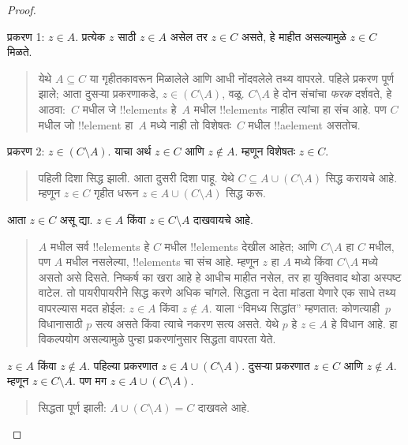 \documentclass[../../../include/open-logic-section]{subfiles}
\begin{document}
\begin{proof}
\begin{quote}
\end{quote}
प्रकरण 1: $z \in A$. प्रत्येक $z$ साठी $z \in A$ असेल तर $z \in C$ असते, हे माहीत असल्यामुळे $z \in C$ मिळते.
\begin{quote}
येथे $A \subseteq C$ या गृहीतकावरून मिळालेले आणि आधी नोंदवलेले तथ्य वापरले. पहिले प्रकरण पूर्ण झाले; आता दुसऱ्या प्रकरणाकडे, $z \in (C \setminus A)$, वळू. $C \setminus A$ हे दोन संचांचा \emph{फरक} दर्शवते, हे आठवा:~$C$ मधील जे !!{element}s हे~$A$ मधील !!{element}s नाहीत त्यांचा हा संच आहे. पण $C$ मधील जो !!{element} हा~$A$ मध्ये नाही तो विशेषतः~$C$ मधील !!a{element} असतोच.
\end{quote}
प्रकरण 2: $z \in (C \setminus A)$. याचा अर्थ $z \in C$ आणि $z \notin A$. म्हणून विशेषतः $z \in C$.
\begin{quote}
पहिली दिशा सिद्ध झाली. आता दुसरी दिशा पाहू. येथे $C \subseteq A \cup (C \setminus A)$ सिद्ध करायचे आहे. म्हणून $z \in C$ गृहीत धरून $z \in A \cup (C \setminus A)$ सिद्ध करू.
\end{quote}
आता $z \in C$ असू द्या. $z \in A$ किंवा $z \in C \setminus A$ दाखवायचे आहे.
\begin{quote}
$A$ मधील सर्व !!{element}s हे $C$ मधील !!{element}s देखील आहेत; आणि $C \setminus A$ हा $C$ मधील, पण $A$ मधील नसलेल्या, !!{element}s चा संच आहे. म्हणून $z$ हा $A$ मध्ये किंवा $C \setminus A$ मध्ये असतो असे दिसते. निष्कर्ष का खरा आहे हे आधीच माहीत नसेल, तर हा युक्तिवाद थोडा अस्पष्ट वाटेल. तो पायरीपायरीने सिद्ध करणे अधिक चांगले. सिद्धता न देता मांडता येणारे एक साधे तथ्य वापरल्यास मदत होईल: $z \in A$ किंवा $z \notin A$. याला “विमध्य सिद्धांत” म्हणतात: कोणत्याही~$p$ विधानासाठी $p$ सत्य असते किंवा त्याचे नकरण सत्य असते. येथे $p$ हे $z \in A$ हे विधान आहे. हा विकल्पयोग असल्यामुळे पुन्हा प्रकरणांनुसार सिद्धता वापरता येते.
\end{quote}
$z \in A$ किंवा $z \notin A$. पहिल्या प्रकरणात $z \in A \cup (C \setminus A)$. दुसऱ्या प्रकरणात $z \in C$ आणि $z \notin A$. म्हणून $z \in C \setminus A$. पण मग $z \in A \cup (C \setminus A)$.
\begin{quote}
सिद्धता पूर्ण झाली: $A \cup (C \setminus A) = C$ दाखवले आहे.
\end{quote}
\end{proof}
\end{document}
